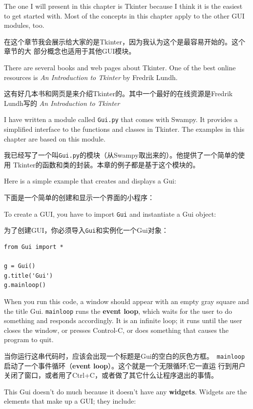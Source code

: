 \documentclass[10pt]{book}
\begin{document}
\begin{CJK}{UTF8}{gbsn}
The one I will present in this chapter is Tkinter because I think
it is the easiest to get started with.  Most of the concepts
in this chapter apply to the other GUI modules, too.

在这个章节我会展示给大家的是Tkinter，因为我认为这个是最容易开始的。这个章节的大
部分概念也适用于其他GUI模块。

There are several books and web pages about Tkinter.  One of
the best online resources is {\em An Introduction to Tkinter}
by Fredrik Lundh.

这有好几本书和网页是来介绍Tkinter的。其中一个最好的在线资源是Fredrik Lundh写的
{\em An Introduction to Tkinter}

I have written a module called {\tt Gui.py} that comes with
Swampy.  It provides a simplified interface to the functions
and classes in Tkinter.  The examples in this chapter are
based on this module.

我已经写了一个叫{\tt Gui.py}的模块（从Swampy取出来的）。他提供了一个简单的使用
Tkinter的函数和类的封装。本章的例子都是基于这个模块的。

Here is a simple example that creates and displays a Gui:

下面是一个简单的创建和显示一个界面的小程序：

To create a GUI, you have to import {\tt Gui} and instantiate
a Gui object:

为了创建GUI，你必须导入{\tt Gui}和实例化一个Gui对象：

\begin{verbatim}
from Gui import *

g = Gui()
g.title('Gui')
g.mainloop()
\end{verbatim}
%
When you run this code, a window should appear with an empty gray
square and the title {\sf Gui}.  {\tt mainloop} runs the {\bf event
  loop}, which waits for the user to do something and responds
accordingly.  It is an infinite loop; it runs until the user closes
the window, or presses Control-C, or does something that causes the
program to quit.

当你运行这串代码时，应该会出现一个标题是{\sf Gui}的空白的灰色方框。{\tt
mainloop}启动了一个事件循环（{\bf event loop}）。这个就是一个无限循环;它一直运
行到用户关闭了窗口，或者用了Ctrl+C，或者做了其它什么让程序退出的事情。

This Gui doesn't do much because it doesn't have any
{\bf widgets}.  Widgets are the elements that make up a
GUI; they include:


\end{CJK}
\end{document}
